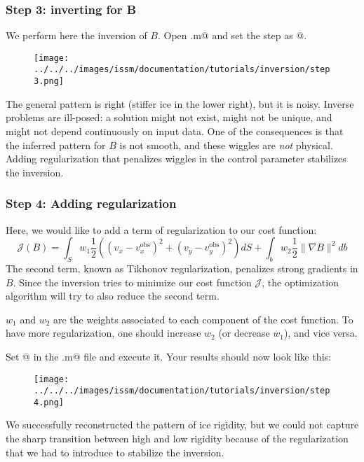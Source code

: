 \subsubsection{Step 3: inverting for B}
We perform here the inversion of $B$. Open \verb@runme.m@ and set the step as @.
\begin{figure}[H]
	\begin{center}
		\texttt{[image: ../../../images/issm/documentation/tutorials/inversion/step3.png]}
	\end{center}
\end{figure}
The general pattern is right (stiffer ice in the lower right), but it is noisy. Inverse problems are
ill-posed: a solution might not exist, might not be unique, and might not depend continuously on
input data. One of the consequences is that the inferred pattern for $B$ is not smooth, and these
wiggles are \emph{not} physical. Adding regularization that penalizes wiggles in the control parameter stabilizes the inversion.

\subsubsection{Step 4: Adding regularization}
Here, we would like to add a term of regularization to our cost function:
\begin{equation}
	{\mathcal J\left(B\right)}
	=
	\int_{S} w_1 \dfrac{1}{2}\left(
	\left(v_x-v_x^{\text{obs}}\right)^{2}
	+\left(v_y-v_y^{\text{obs}}\right)^{2}
	\right) dS
	+
	\int_{b} w_2 \dfrac{1}{2}
	\|\nabla B \|^{2}
	db
\end{equation}
The second term, known as Tikhonov regularization, penalizes strong gradients in $B$. Since the inversion tries to minimize our cost function $\mathcal J$, the optimization algorithm will try to also reduce the second term.

$w_1$ and $w_2$ are the weights associated to each component of the cost function. To have more regularization, one should increase $w_2$ (or decrease $w_1$), and vice versa.

Set @ in the \verb@runme.m@ file and execute it. Your results should now look like this:
\begin{figure}[H]
	\begin{center}
		\texttt{[image: ../../../images/issm/documentation/tutorials/inversion/step4.png]}
	\end{center}
\end{figure}
We successfully reconstructed the pattern of ice rigidity, but we could not capture the sharp transition between high and low rigidity because of the regularization that we had to introduce to stabilize the inversion.
